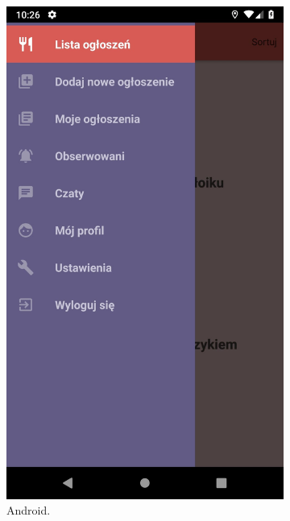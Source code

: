 \documentclass[licencjacka]{pracamgr}
\begin{document}
\newpage
\begin{figure}[h!]
  \centering
  \begin{subfigure}[b]{0.4\linewidth}
    \begin{framed}
      \includegraphics[width=\linewidth]{android3.jpg}
    \end{framed}
    \caption{Android.}
  \end{subfigure}
  \begin{subfigure}[b]{0.4\linewidth}
    \begin{framed}

\end{framed}
\end{subfigure}
\end{figure}
\end{document}
